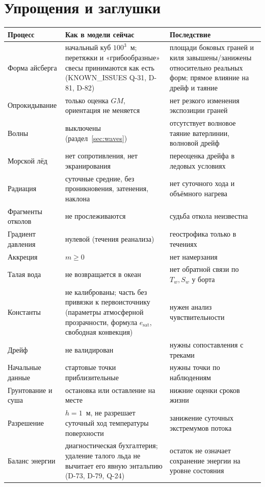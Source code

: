 \documentclass[12pt,a4paper]{article}
\begin{document}
\section{Упрощения и заглушки}\label{sec:stubs}

\begin{longtable}{@{}p{3.1cm}p{6.2cm}p{5.6cm}@{}}
\toprule
Процесс & Как в модели сейчас & Последствие\\
\midrule
\endhead
Форма айсберга & начальный куб $100^3$~м; перетяжки и «грибообразные» свесы принимаются как есть (KNOWN\_ISSUES Q-31, D-81, D-82) & площади боковых граней и киля завышены/занижены относительно реальных форм; прямое влияние на дрейф и таяние\\
Опрокидывание & только оценка $GM$, ориентация не меняется & нет резкого изменения экспозиции граней\\
Волны & выключены (раздел~\ref{sec:waves}) & отсутствует волновое таяние ватерлинии, волновой дрейф\\
Морской лёд & нет сопротивления, нет экранирования & переоценка дрейфа в ледовых условиях\\
Радиация & суточные средние, без проникновения, затенения, наклона & нет суточного хода и объёмного нагрева\\
Фрагменты отколов & не прослеживаются & судьба откола неизвестна\\
Градиент давления & нулевой (течения реанализа) & геострофика только в течениях\\
Аккреция & $m\ge0$ & нет намерзания\\
Талая вода & не возвращается в океан & нет обратной связи по $T_w,S_w$ у борта\\
Константы & не калиброваны; часть без привязки к первоисточнику (параметры атмосферной прозрачности, формула $e_{\mathrm{sat}}$, свободная конвекция) & нужен анализ чувствительности\\
Дрейф & не валидирован & нужны сопоставления с треками\\
Начальные данные & стартовые точки приблизительные & нужны точки по наблюдениям\\
Грунтование и суша & остановка или оставление на месте & нижние оценки сроков жизни\\
Разрешение & $h=1$~м, не разрешает суточный ход температуры поверхности & занижение суточных экстремумов потока\\
Баланс энергии & диагностическая бухгалтерия; удаление талого льда не вычитает его явную энтальпию (D-73, D-79, Q-24) & остаток не означает сохранение энергии на уровне состояния\\
\bottomrule
\end{longtable}
\end{document}
